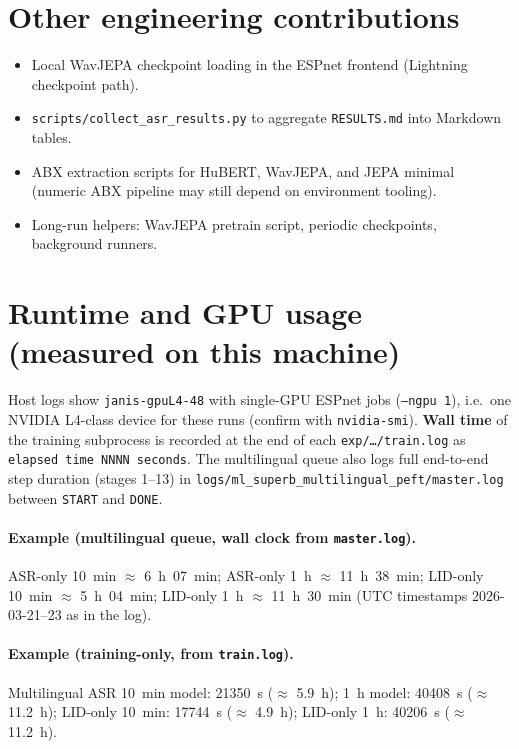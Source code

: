 \documentclass[11pt,a4paper]{article}
\begin{document}
\section{Other engineering contributions}
\begin{itemize}[leftmargin=*]
    \item Local WavJEPA checkpoint loading in the ESPnet frontend (Lightning checkpoint path).
    \item \texttt{scripts/collect\_asr\_results.py} to aggregate \texttt{RESULTS.md} into Markdown tables.
    \item ABX extraction scripts for HuBERT, WavJEPA, and JEPA minimal (numeric ABX pipeline may still depend on environment tooling).
    \item Long-run helpers: WavJEPA pretrain script, periodic checkpoints, background runners.
\end{itemize}

\section{Runtime and GPU usage (measured on this machine)}
Host logs show \texttt{janis-gpuL4-48} with single-GPU ESPnet jobs (\texttt{--ngpu 1}), i.e.\ one NVIDIA L4-class device for these runs (confirm with \texttt{nvidia-smi}). \textbf{Wall time} of the training subprocess is recorded at the end of each \texttt{exp/\dots/train.log} as \texttt{elapsed time NNNN seconds}. The multilingual queue also logs full end-to-end step duration (stages 1--13) in \texttt{logs/ml\_superb\_multilingual\_peft/master.log} between \texttt{START} and \texttt{DONE}.

\paragraph{Example (multilingual queue, wall clock from \texttt{master.log}).}
ASR-only 10~min $\approx$ 6~h~07~min; ASR-only 1~h $\approx$ 11~h~38~min; LID-only 10~min $\approx$ 5~h~04~min; LID-only 1~h $\approx$ 11~h~30~min (UTC timestamps 2026-03-21--23 as in the log).

\paragraph{Example (training-only, from \texttt{train.log}).}
Multilingual ASR 10~min model: 21350~s ($\approx$ 5.9~h); 1~h model: 40408~s ($\approx$ 11.2~h); LID-only 10~min: 17744~s ($\approx$ 4.9~h); LID-only 1~h: 40206~s ($\approx$ 11.2~h).
\end{document}
